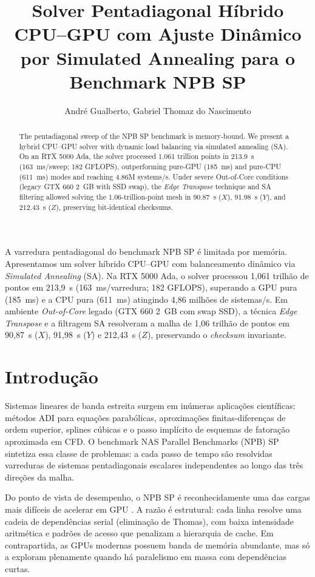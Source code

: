 \documentclass[12pt]{article}
\title{Solver Pentadiagonal Híbrido CPU--GPU com Ajuste Dinâmico por
Simulated Annealing para o Benchmark NPB SP}
\author{André Gualberto\inst{1}, Gabriel Thomaz do Nascimento\inst{1}}
\begin{document}
\maketitle

\begin{abstract}
  The pentadiagonal sweep of the NPB SP benchmark is memory-bound. We present a hybrid CPU--GPU solver with dynamic load balancing via simulated annealing (SA). On an RTX 5000 Ada, the solver processed 1.061 trillion points in 213.9~s (163~ms/sweep; 182 GFLOPS), outperforming pure-GPU (185~ms) and pure-CPU (611~ms) modes and reaching 4.86M systems/s. Under severe Out-of-Core conditions (legacy GTX 660 2~GB with SSD swap), the \textit{Edge Transpose} technique and SA filtering allowed solving the 1.06-trillion-point mesh in 90.87~s ($X$), 91.98~s ($Y$), and 212.43~s ($Z$), preserving bit-identical checksums.
\end{abstract}

\begin{resumo}
  A varredura pentadiagonal do benchmark NPB SP é limitada por memória. Apresentamos um solver híbrido CPU--GPU com balanceamento dinâmico via \textit{Simulated Annealing} (SA). Na RTX 5000 Ada, o solver processou 1,061 trilhão de pontos em 213,9~s (163~ms/varredura; 182 GFLOPS), superando a GPU pura (185~ms) e a CPU pura (611~ms) atingindo 4,86 milhões de sistemas/s. Em ambiente \textit{Out-of-Core} legado (GTX 660 2~GB com swap SSD), a técnica \textit{Edge Transpose} e a filtragem SA resolveram a malha de 1,06 trilhão de pontos em 90,87~s ($X$), 91,98~s ($Y$) e 212,43~s ($Z$), preservando o \textit{checksum} invariante.
\end{resumo}

\section{Introdução}

Sistemas lineares de banda estreita surgem em inúmeras aplicações
científicas: métodos ADI para equações parabólicas, aproximações
finitas-diferenças de ordem superior, splines cúbicas e o passo implícito de
esquemas de fatoração aproximada em CFD. O benchmark NAS Parallel Benchmarks
(NPB) SP \cite{bailey:1991} sintetiza essa classe de problemas: a cada passo
de tempo são resolvidas varreduras de sistemas pentadiagonais escalares
independentes ao longo das três direções da malha.

Do ponto de vista de desempenho, o NPB SP é reconhecidamente uma das
cargas mais difíceis de acelerar em GPU \cite{araujo:2021}. A razão é
estrutural: cada linha resolve uma cadeia de dependências serial (eliminação
de Thomas), com baixa intensidade aritmética e padrões de acesso que
penalizam a hierarquia de cache. Em contrapartida, as GPUs modernas possuem
banda de memória abundante, mas só a exploram plenamente quando há
paralelismo em massa com dependências curtas.
\end{document}
